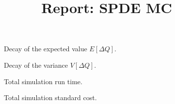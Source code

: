 \documentclass[11pt, oneside]{article}
\title{Report: SPDE MC}
\date{}
\newlength\figureheight
\newlength\figurewidth
\begin{document}
\maketitle

\begin{figure}[h]
\centering
\setlength{\figureheight}{0.3\textwidth}
\setlength{\figurewidth}{0.3\textwidth}

 \caption{\label{fig:E}Decay of the expected value $E[\Delta Q]$.}
\end{figure}


\begin{figure}[h]
\centering
\setlength{\figureheight}{0.3\textwidth}
\setlength{\figurewidth}{0.3\textwidth}

 \caption{\label{fig:V}Decay of the variance $V[\Delta Q]$.}
\end{figure}




\begin{figure}[h]
\centering
\setlength{\figureheight}{0.3\textwidth}
\setlength{\figurewidth}{0.3\textwidth}

 \caption{\label{fig:time}Total simulation run time.}
\end{figure}


\begin{figure}[h]
\centering
\setlength{\figureheight}{0.3\textwidth}
\setlength{\figurewidth}{0.3\textwidth}

 \caption{\label{fig:cost}Total simulation standard cost.}
\end{figure}
\end{document}
